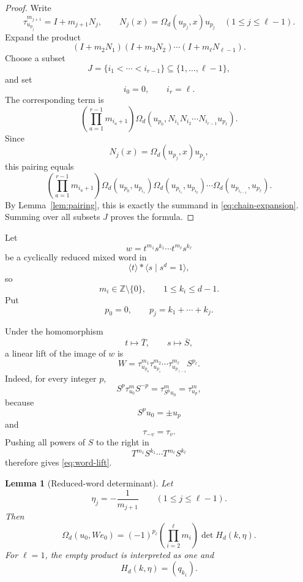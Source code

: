 \documentclass[a4paper,11pt]{amsart}
\newcommand{\Z}{\mathbb Z}
\newtheorem{lemma}[theorem]{Lemma}
\theoremstyle{remark}
\numberwithin{equation}{section}
\begin{document}
\begin{proof}
Write
\[
\tau_{u_{p_j}}^{m_{j+1}}
=
I+m_{j+1}N_j,
\qquad
N_j(x)=\Omega_d(u_{p_j},x)u_{p_j}
\quad(1\leq j\leq\ell-1).
\]
Expand the product
\[
(I+m_2N_1)(I+m_3N_2)\cdots(I+m_\ell N_{\ell-1}).
\]
Choose a subset
\[
J=\{i_1<\cdots<i_{r-1}\}
\subseteq\{1,\ldots,\ell-1\},
\]
and set
\[
i_0=0,
\qquad
i_r=\ell.
\]
The corresponding term is
\[
\left(\prod_{a=1}^{r-1}m_{i_a+1}\right)
\Omega_d\left(
u_{p_0},
N_{i_1}N_{i_2}\cdots N_{i_{r-1}}u_{p_\ell}
\right).
\]
Since
\[
N_j(x)=\Omega_d(u_{p_j},x)u_{p_j},
\]
this pairing equals
\[
\left(\prod_{a=1}^{r-1}m_{i_a+1}\right)
\Omega_d(u_{p_0},u_{p_{i_1}})
\Omega_d(u_{p_{i_1}},u_{p_{i_2}})
\cdots
\Omega_d(u_{p_{i_{r-1}}},u_{p_\ell}).
\]
By Lemma~\ref{lem:pairing}, this is exactly the summand in \eqref{eq:chain-expansion}. Summing over all subsets \(J\) proves the formula.
\end{proof}

Let
\[
w=t^{m_1}s^{k_1}\cdots t^{m_\ell}s^{k_\ell}
\]
be a cyclically reduced mixed word in
\[
\langle t\rangle *\langle s\mid s^d=1\rangle,
\]
so
\[
m_i\in\Z\setminus\{0\},
\qquad
1\leq k_i\leq d-1.
\]
Put
\[
p_0=0,
\qquad
p_j=k_1+\cdots+k_j.
\]

Under the homomorphism
\[
t\mapsto \overline T,
\qquad
s\mapsto \overline S,
\]
a linear lift of the image of \(w\) is
\begin{equation}\label{eq:word-lift}
W=
\tau_{u_{p_0}}^{m_1}
\tau_{u_{p_1}}^{m_2}
\cdots
\tau_{u_{p_{\ell-1}}}^{m_\ell}
S^{p_\ell}.
\end{equation}
Indeed, for every integer \(p\),
\[
S^p\tau_{u_0}^mS^{-p}
=
\tau_{S^pu_0}^m
=
\tau_{u_p}^m,
\]
because
\[
S^pu_0=\pm u_p
\]
and
\[
\tau_{-v}=\tau_v.
\]
Pushing all powers of \(S\) to the right in
\[
T^{m_1}S^{k_1}\cdots T^{m_\ell}S^{k_\ell}
\]
therefore gives \eqref{eq:word-lift}.

\begin{lemma}[Reduced-word determinant]\label{lem:word-determinant}
Let
\[
\eta_j=-\frac1{m_{j+1}}
\qquad(1\leq j\leq \ell-1).
\]
Then
\begin{equation}\label{eq:word-determinant}
\Omega_d(u_0,We_0)
=
(-1)^{p_\ell}
\left(\prod_{i=2}^{\ell}m_i\right)
\det H_d(k,\eta).
\end{equation}
For \(\ell=1\), the empty product is interpreted as one and
\[
H_d(k,\eta)=(q_{k_1}).
\]
\end{lemma}
\end{document}

